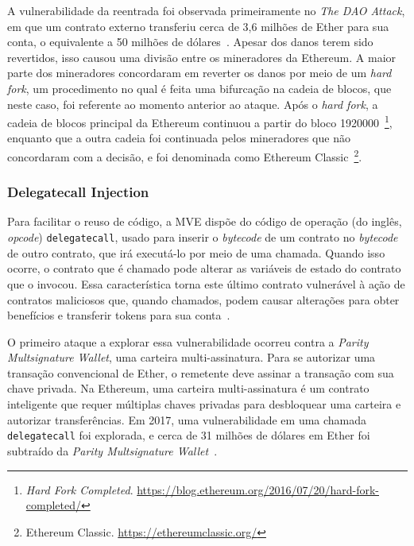 A vulnerabilidade da reentrada foi observada primeiramente no \textit{The DAO Attack}, em que um contrato externo transferiu cerca de 3,6 milhões de Ether para sua conta, o equivalente a 50 milhões de dólares~\cite{siegel-dao-attack}. Apesar dos danos terem sido revertidos, isso causou uma divisão entre os mineradores da Ethereum. A maior parte dos mineradores concordaram em reverter os danos por meio de um \textit{hard fork}, um procedimento no qual é feita uma bifurcação na cadeia de blocos, que neste caso, foi referente ao momento anterior ao ataque. Após o \textit{hard fork}, a cadeia de blocos principal da Ethereum continuou a partir do bloco 1920000~\footnote{\textit{Hard Fork Completed}. \url{https://blog.ethereum.org/2016/07/20/hard-fork-completed/}}, enquanto que a outra cadeia foi continuada pelos mineradores que não concordaram com a decisão, e foi denominada como Ethereum Classic~\footnote{Ethereum Classic. \url{https://ethereumclassic.org/}}.  

\subsubsection*{\textbf{Delegatecall Injection}}

Para facilitar o reuso de código, a MVE dispõe do código de operação (do inglês, \textit{opcode}) \texttt{delegatecall}, usado para inserir o \textit{bytecode} de um contrato no \textit{bytecode} de outro contrato, que irá executá-lo por meio de uma chamada. Quando isso ocorre, o contrato que é chamado pode alterar as variáveis de estado do contrato que o invocou. Essa característica torna este último contrato vulnerável à ação de contratos maliciosos que, quando chamados, podem causar alterações para obter benefícios e transferir tokens para sua conta~\cite{chen2020survey-ethereum-acm}.

O primeiro ataque a explorar essa vulnerabilidade ocorreu contra a \textit{Parity Multsignature Wallet}, uma carteira multi-assinatura. Para se autorizar uma transação convencional de Ether, o remetente deve assinar a transação com sua chave privada. Na Ethereum, uma carteira multi-assinatura é um contrato inteligente que requer múltiplas chaves privadas para desbloquear uma carteira e autorizar transferências. Em 2017, uma vulnerabilidade em uma chamada \texttt{delegatecall} foi explorada, e cerca de 31 milhões de dólares em Ether foi subtraído da \textit{Parity Multsignature Wallet}~\cite{chen2020survey-ethereum-acm}.




